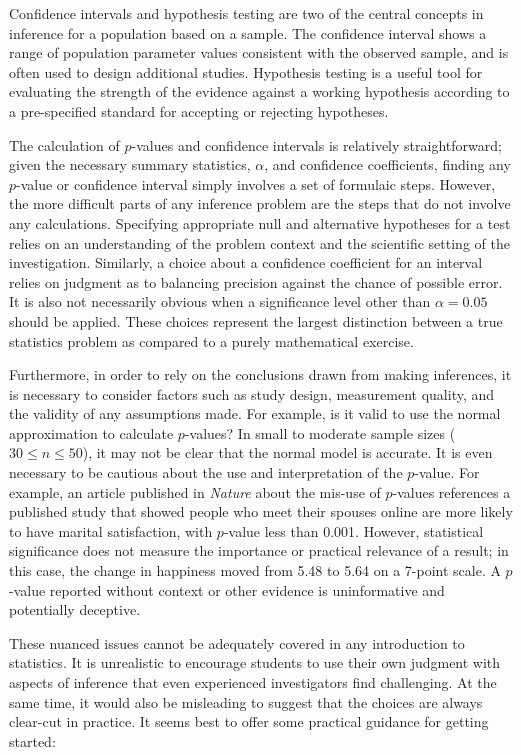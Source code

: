 \begin{spacing}{1.5}
Confidence intervals and hypothesis testing are two of the central concepts in inference for a population based on a sample. The confidence interval shows a range of population parameter values consistent with the observed sample, and is often used to design additional studies. Hypothesis testing is a useful tool for evaluating the strength of the evidence against a working hypothesis according to a pre-specified standard for accepting or rejecting hypotheses.

The calculation of $p$-values and confidence intervals is relatively straightforward; given the necessary summary statistics, $\alpha$, and confidence coefficients, finding any $p$-value or confidence interval simply involves a set of formulaic steps. However, the more difficult parts of any inference problem are the steps that do not involve any calculations. Specifying appropriate null and alternative hypotheses for a test relies on an understanding of the problem context and the scientific setting of the investigation. Similarly, a choice about a confidence coefficient for an interval relies on judgment as to balancing precision against the chance of possible error. It is also not necessarily obvious when a significance level other than $\alpha = 0.05$ should be applied. These choices represent the largest distinction between a true statistics problem as compared to a purely mathematical exercise. 

Furthermore, in order to rely on the conclusions drawn from making inferences, it is necessary to consider factors such as study design, measurement quality, and the validity of any assumptions made. For example, is it valid to use the normal approximation to calculate $p$-values? In small to moderate sample sizes ($30 \leq n \leq 50$), it may not be clear that the normal model is accurate. It is even necessary to be cautious about the use and interpretation of the $p$-value. For example, an article published in \textit{Nature} about the mis-use of $p$-values references a published study that showed people who meet their spouses online are more likely to have marital satisfaction, with $p$-value less than 0.001. However, statistical significance does not measure the importance or practical relevance of a result; in this case, the change in happiness moved from 5.48 to 5.64 on a 7-point scale. A $p$-value reported without context or other evidence is uninformative and potentially deceptive.


These nuanced issues cannot be adequately covered in any introduction to statistics. It is unrealistic to encourage students to use their own judgment with aspects of inference that even experienced investigators find challenging. At the same time, it would also be misleading to suggest that the choices are always clear-cut in practice. It seems best to offer some practical guidance for getting started:


\end{spacing}
